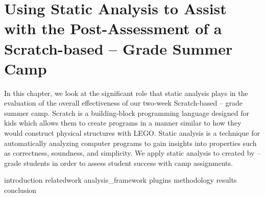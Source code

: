 \chapter{Using Static Analysis to Assist with the Post-Assessment of a
  Scratch-based -- Grade Summer Camp}
\label{chap:hairball}

In this chapter, we look at the significant role that static analysis plays in
the evaluation of the overall effectiveness of our two-week Scratch-based
-- grade summer camp. Scratch is a building-block programming
language designed for kids which allows them to create programs in a manner
similar to how they would construct physical structures with
LEGO\textregistered{}. Static analysis is a technique for automatically
analyzing computer programs to gain insights into properties such as
correctness, soundness, and simplicity. We apply static analysis to
 created by -- grade students in order to assess
student success with camp assignments.

\iffull
\def\currentprefix{hairball}
{introduction}
{relatedwork}
{analysis_framework}
{plugins}
{methodology}
{results}
{conclusion}
\fi
